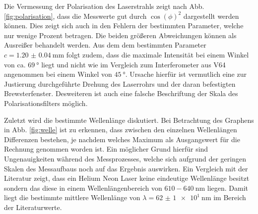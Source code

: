 Die Vermessung der Polarisation des Laserstrahls zeigt nach Abb. \ref{fig:polarisation}, dass die Messwerte gut durch $\cos(\phi)^2$ dargestellt werden können. Dies zeigt sich auch in den Fehlern der bestimmten Parameter, welche nur wenige Prozent betragen. Die beiden größeren Abweichungen können als Ausreißer behandelt werden. Aus dem dem bestimmten Parameter $c = \SI{1.20(4)}{\milli\meter}$ folgt zudem, dass die maximale Intensität bei einem Winkel von ca. $\SI{69}{\degree}$ liegt und nicht wie im Vergleich zum Interferometer aus V64 angenommen bei einem Winkel von $\SI{45}{\degree}$. Ursache hierfür ist vermutlich eine zur Justierung durchgeführte Drehung des Laserrohrs und der daran befestigten Brewsterfenster. Desweiteren ist auch eine falsche Beschriftung der Skala des Polarisationsfilters möglich.


Zuletzt wird die bestimmte Wellenlänge diskutiert.
Bei Betrachtung des Graphens in Abb. \ref{fig:welle} ist zu erkennen, dass zwischen den einzelnen Wellenlängen Differenzen bestehen, je nachdem welches Maximum als Ausgangswert für die Rechnung genommen worden ist. Ein möglicher Grund hierfür sind Ungenauigkeiten während des Messprozesses, welche sich aufgrund der geringen Skalen des Messaufbaus noch auf das Ergebnis auswirken. Ein Vergleich mit der Literatur \cite{VHeNeGoettingen} zeigt, dass ein Helium Neon Laser keine eindeutige Wellenlänge besitzt sondern das diese in einem Wellenlängenbereich von $610-\SI{640}{\nano\meter}$ liegen. Damit liegt die bestimmte mittlere Wellenlänge von $\lambda = \SI{62(1)e1}{\nano\meter}$ im Bereich der Literaturwerte. 